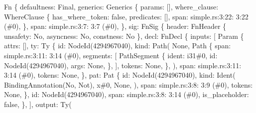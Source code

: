 \documentclass[
  11pt,
  twoside]{report}
\newenvironment{Shaded}{}{}
\newcommand{\NormalTok}[1]{#1}
\begin{document}
\begin{Shaded}
\begin{Highlighting}[]
\NormalTok{Fn \{}
\NormalTok{    defaultness: Final,}
\NormalTok{    generics: Generics \{}
\NormalTok{        params: [],}
\NormalTok{        where\_clause: WhereClause \{}
\NormalTok{            has\_where\_token: false,}
\NormalTok{            predicates: [],}
\NormalTok{            span: simple.rs:3:22: 3:22 (\#0),}
\NormalTok{        \},}
\NormalTok{        span: simple.rs:3:7: 3:7 (\#0),}
\NormalTok{    \},}
\NormalTok{    sig: FnSig \{}
\NormalTok{        header: FnHeader \{ unsafety: No, asyncness: No, constness: No \},}
\NormalTok{        decl: FnDecl \{}
\NormalTok{            inputs: [}
\NormalTok{                Param \{}
\NormalTok{                    attrs: [],}
\NormalTok{                    ty: Ty \{}
\NormalTok{                        id: NodeId(4294967040),}
\NormalTok{                        kind: Path(}
\NormalTok{                            None,}
\NormalTok{                            Path \{}
\NormalTok{                                span: simple.rs:3:11: 3:14 (\#0),}
\NormalTok{                                segments: [}
\NormalTok{                                    PathSegment \{}
\NormalTok{                                        ident: i31\#0,}
\NormalTok{                                        id: NodeId(4294967040),}
\NormalTok{                                        args: None,}
\NormalTok{                                    \},}
\NormalTok{                                ],}
\NormalTok{                                tokens: None,}
\NormalTok{                            \},}
\NormalTok{                        ),}
\NormalTok{                        span: simple.rs:3:11: 3:14 (\#0),}
\NormalTok{                        tokens: None,}
\NormalTok{                    \},}
\NormalTok{                    pat: Pat \{}
\NormalTok{                        id: NodeId(4294967040),}
\NormalTok{                        kind: Ident(}
\NormalTok{                            BindingAnnotation(No, Not),}
\NormalTok{                            x\#0,}
\NormalTok{                            None,}
\NormalTok{                        ),}
\NormalTok{                        span: simple.rs:3:8: 3:9 (\#0),}
\NormalTok{                        tokens: None,}
\NormalTok{                    \},}
\NormalTok{                    id: NodeId(4294967040),}
\NormalTok{                    span: simple.rs:3:8: 3:14 (\#0),}
\NormalTok{                    is\_placeholder: false,}
\NormalTok{                \},}
\NormalTok{            ],}
\NormalTok{            output: Ty(}

\end{Highlighting}
\end{Shaded}
\end{document}
